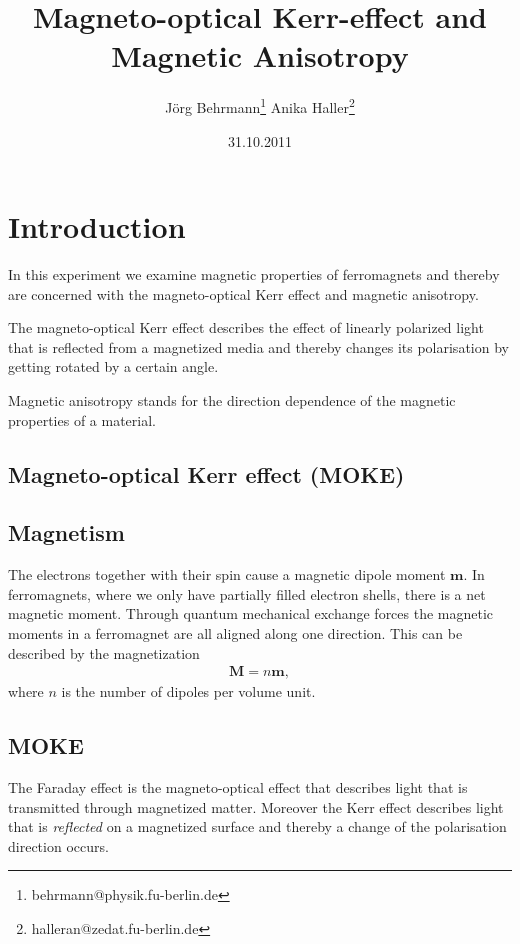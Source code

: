 \documentclass[a4paper,10pt]{scrartcl}
\begin{document}
\title{Magneto-optical Kerr-effect and Magnetic Anisotropy}
\author{J\"org Behrmann\footnote{behrmann@physik.fu-berlin.de} \qquad Anika Haller\footnote{halleran@zedat.fu-berlin.de}}
\date{31.10.2011}
\maketitle
\tableofcontents
\thispagestyle{empty}


\section{Introduction}
In this experiment we examine magnetic properties of ferromagnets and thereby are concerned with the magneto-optical Kerr effect and magnetic anisotropy.

The magneto-optical Kerr effect describes the effect of  linearly polarized light that is reflected from a magnetized media and thereby changes its polarisation by getting rotated by a certain angle. 

Magnetic anisotropy stands for the direction dependence of the magnetic properties of a material.

\subsection{Magneto-optical Kerr effect (MOKE)}


\subsection{Magnetism}
The electrons together with their spin cause a magnetic dipole moment $\mathbf{m}$. In ferromagnets, where we only have partially filled electron shells, there is a net magnetic moment. Through quantum mechanical exchange forces the magnetic moments in a ferromagnet are all aligned along one direction. This can be described by the magnetization 
\begin{eqnarray}
 \mathbf{M} = n \mathbf{m},
\end{eqnarray}
where $n$ is the number of dipoles per volume unit.

\subsection{MOKE}
The Faraday effect is the magneto-optical effect that describes light that is transmitted through magnetized matter. Moreover the Kerr effect describes light that is \textit{reflected} on a magnetized surface and thereby a change of the polarisation direction occurs. 
\end{document}
